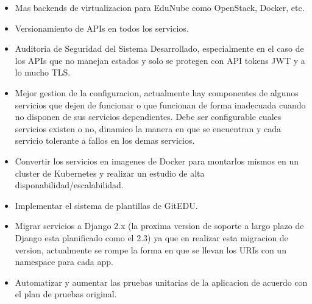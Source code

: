 \begin{itemize}
    \item Mas backends de virtualizacion para EduNube como OpenStack, Docker, etc.
    \item Versionamiento de APIs en todos los servicios.
    \item Auditoria de Seguridad del Sistema Desarrollado, especialmente en el caso de los APIs que no manejan estados y solo se protegen con API tokens JWT y a lo mucho TLS.
    \item Mejor gestion de la configuracion, actualmente hay componentes de algunos servicios que dejen de funcionar o que funcionan de forma inadecuada cuando no disponen de sus servicios dependientes. Debe ser configurable cuales servicios existen o no, dinamico la manera en que se encuentran y cada servicio tolerante a fallos en los demas servicios.
    \item Convertir los servicios en imagenes de Docker para montarlos mismos en un cluster de Kubernetes y realizar un estudio de alta disponabilidad/escalabilidad.
    \item Implementar el sistema de plantillas de GitEDU.
    \item Migrar servicios a Django 2.x (la proxima version de soporte a largo plazo de Django esta planificado como el 2.3) ya que en realizar esta migracion de version, actualmente se rompe la forma en que se llevan los URIs con un namespace para cada app.
    \item Automatizar y aumentar las pruebas unitarias de la aplicacion de acuerdo con el plan de pruebas original.
\end{itemize}
